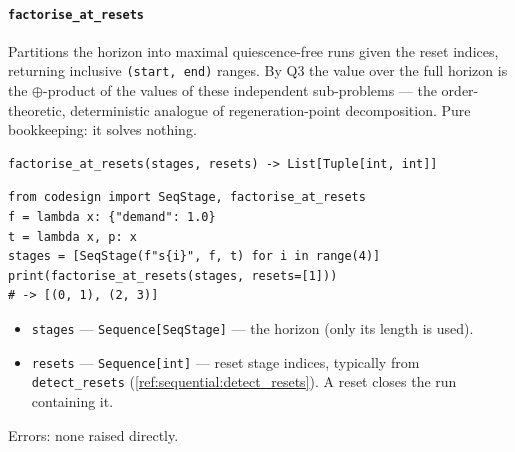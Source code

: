 \documentclass[11pt,a4paper]{article}
\begin{document}
\paragraph{\texttt{factorise\_at\_resets}}\label{ref:sequential:factorise_at_resets}
Partitions the horizon into maximal quiescence-free runs given the reset
indices, returning inclusive \texttt{(start, end)} ranges. By Q3 the value
over the full horizon is the $\oplus$-product of the values of these
independent sub-problems --- the order-theoretic, deterministic analogue of
regeneration-point decomposition. Pure bookkeeping: it solves nothing.
\begin{lstlisting}
factorise_at_resets(stages, resets) -> List[Tuple[int, int]]
\end{lstlisting}
\begin{lstlisting}
from codesign import SeqStage, factorise_at_resets
f = lambda x: {"demand": 1.0}
t = lambda x, p: x
stages = [SeqStage(f"s{i}", f, t) for i in range(4)]
print(factorise_at_resets(stages, resets=[1]))
# -> [(0, 1), (2, 3)]
\end{lstlisting}
\begin{itemize}[nosep]
  \item \texttt{stages} --- \texttt{Sequence[SeqStage]} --- the horizon
    (only its length is used).
  \item \texttt{resets} --- \texttt{Sequence[int]} --- reset stage indices,
    typically from \texttt{detect\_resets}
    (\ref{ref:sequential:detect_resets}). A reset closes the run containing
    it.
\end{itemize}
Errors: none raised directly.
\end{document}
